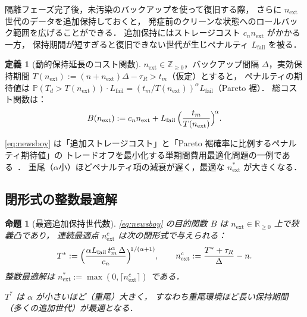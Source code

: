 \documentclass[12pt,a4paper]{article}
\theoremstyle{plain}
\newtheorem{proposition}[theorem]{命題}
\theoremstyle{definition}
\newtheorem{definition}[theorem]{定義}
\theoremstyle{remark}
\newcommand{\Prob}{\mathbb{P}}
\newcommand{\Z}{\mathbb{Z}}
\begin{document}
隔離フェーズ完了後，未汚染のバックアップを使って復旧する際，
さらに $n_{\mathrm{ext}}$ 世代のデータを追加保持しておくと，
発症前のクリーンな状態へのロールバック範囲を広げることができる．
追加保持にはストレージコスト $c_n n_{\mathrm{ext}}$ がかかる一方，
保持期間が短すぎると復旧できない世代が生じペナルティ $L_{\mathrm{fail}}$ を被る．

\begin{definition}[動的保持延長のコスト関数]\label{def:newsboy}
$n_{\mathrm{ext}}\in\Z_{\ge0}$，バックアップ間隔 $\Delta$，実効保持期間
$T(n_{\mathrm{ext}}):=(n+n_{\mathrm{ext}})\Delta-\tau_R>t_m$（仮定）とすると，
ペナルティの期待値は $\Prob(T_d>T(n_{\mathrm{ext}}))\cdot L_{\mathrm{fail}}=(t_m/T(n_{\mathrm{ext}}))^\alpha L_{\mathrm{fail}}$（Pareto 裾）．
総コスト関数は：
\begin{equation}\label{eq:newsboy}
B(n_{\mathrm{ext}}):=c_n n_{\mathrm{ext}}+L_{\mathrm{fail}}\,\Bigl(\frac{t_m}{T(n_{\mathrm{ext}})}\Bigr)^{\!\alpha}.
\end{equation}
\end{definition}

\eqref{eq:newsboy} は「追加ストレージコスト」と「Pareto 裾確率に比例するペナルティ期待値」の
トレードオフを最小化する単期間費用最適化問題の一例である~\cite{porteus2002}．
重尾（$\alpha$小）ほどペナルティ項の減衰が遅く，最適な $n_{\mathrm{ext}}^*$ が大きくなる．

\subsection{閉形式の整数最適解}

\begin{proposition}[最適追加保持世代数]\label{prop:newsboy}
\eqref{eq:newsboy} の目的関数 $B$ は $n_{\mathrm{ext}}\in\mathbb{R}_{\ge0}$ 上で狭義凸であり，
連続最適点 $n_{\mathrm{ext}}^c$ は次の閉形式で与えられる：
\begin{equation}\label{eq:T_star}
T^*:=\Bigl(\frac{\alpha L_{\mathrm{fail}}\,t_m^\alpha\,\Delta}{c_n}\Bigr)^{\!1/(\alpha+1)},
\qquad
n_{\mathrm{ext}}^c:=\frac{T^*+\tau_R}{\Delta}-n.
\end{equation}
整数最適解は $n_{\mathrm{ext}}^*:=\max(0,\lceil n_{\mathrm{ext}}^c\rceil)$ である．

$T^*$ は $\alpha$ が小さいほど（重尾）大きく，
すなわち重尾環境ほど長い保持期間（多くの追加世代）が最適となる．
\end{proposition}
\end{document}
